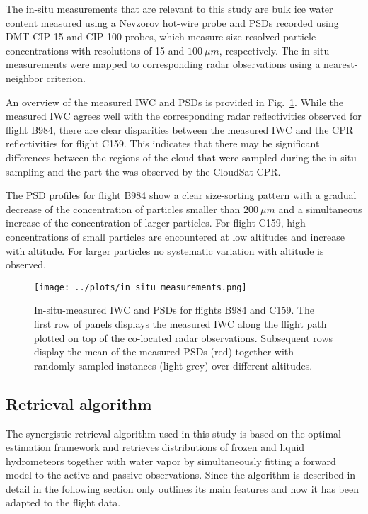 \documentclass[journal abbreviation, manuscript]{copernicus}
\begin{document}
The in-situ measurements that are relevant to this study are bulk ice water
content measured using a Nevzorov hot-wire probe \citep{korolev13} and PSDs
recorded using DMT CIP-15 and CIP-100 probes, which measure size-resolved
particle concentrations with resolutions of 15 and $100\ \unit{\mu m}$,
respectively. The in-situ measurements were mapped to corresponding radar
observations using a nearest-neighbor criterion.

An overview of the measured IWC and PSDs is provided in Fig.~\ref{fig:in_situ}.
While the measured IWC agrees well with the corresponding radar reflectivities
observed for flight B984, there are clear disparities between the measured IWC
and the CPR reflectivities for flight C159. This indicates that there may be
significant differences between the regions of the cloud that were sampled
during the in-situ sampling and the part the was observed by the CloudSat CPR.

The PSD profiles for flight B984 show a clear size-sorting pattern with a
gradual decrease of the concentration of particles smaller than $200\ \unit{\mu
  m}$ and a simultaneous increase of the concentration of larger particles. For
flight C159, high concentrations of small particles are encountered at low
altitudes and increase with altitude. For larger particles no systematic
variation with altitude is observed.

\begin{figure}[hbpt!]
  \centering
  \texttt{[image: ../plots/in\_situ\_measurements.png]}
  \caption{
    In-situ-measured IWC and PSDs for flights B984 and C159. The first row of
    panels displays the measured IWC along the flight path plotted on top of the
    co-located radar observations. Subsequent rows display the mean of the
    measured PSDs (red) together with randomly sampled instances (light-grey)
    over different altitudes.
    }
  \label{fig:in_situ}
\end{figure}

\subsection{Retrieval algorithm}
\label{sec:synergistic_retrieval}

The synergistic retrieval algorithm used in this study is based on the optimal
estimation framework \citep{rodgers00} and retrieves distributions of frozen and
liquid hydrometeors together with water vapor by simultaneously fitting a
forward model to the active and passive observations. Since the algorithm is
described in detail in \citet{pfreundschuh20} the following section only
outlines its main features and how it has been adapted to the flight data.
\end{document}
